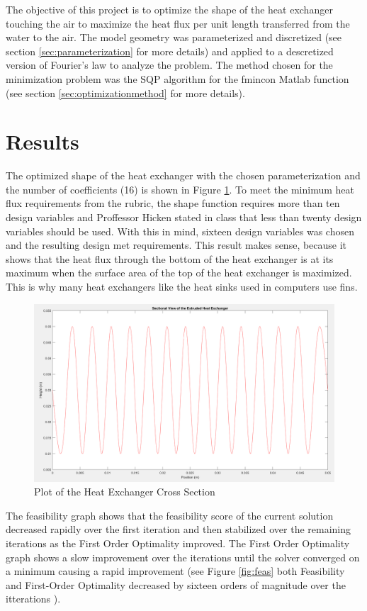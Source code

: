 \documentclass[11pt]{article}%
\begin{document}
The objective of this project is to optimize the shape of the heat exchanger touching the air to maximize the heat flux per unit length transferred from the water to the air. The model geometry was parameterized and discretized (see section \ref{sec:parameterization} for more details) and applied to a descretized version of Fourier’s law to analyze the problem. The method chosen for the minimization problem was the SQP algorithm for the fmincon Matlab function (see section  \ref{sec:optimizationmethod} for more details). 

\section{Results}
The optimized shape of the heat exchanger with the chosen parameterization and the number of coefficients (16) is shown in Figure \ref{fig:cross}. To meet the minimum heat flux requirements from the rubric, the shape function requires more than ten design variables and Proffessor Hicken stated in class that less than twenty design variables should be used. With this in mind, sixteen design variables was chosen and the resulting design met requirements. This result makes sense, because it shows that the heat flux through the bottom of the heat exchanger is at its maximum when the surface area of the top of the heat exchanger is maximized. This is why many heat exchangers like the heat sinks used in computers use fins. 

\begin{figure}[h!]
    \centering
    \includegraphics[width=0.75\linewidth]{crosssection.png}
    \caption{ Plot of the Heat Exchanger Cross Section }
    \label{fig:cross}
\end{figure}

The feasibility graph shows that the feasibility score of the current solution decreased rapidly over the first iteration and then stabilized over the remaining iterations as the First Order Optimality improved. The First Order Optimality graph shows a slow improvement over the iterations until the solver converged on a minimum causing a rapid improvement (see Figure \ref{fig:feas} both Feasibility and First-Order Optimality decreased by sixteen orders of magnitude over the itterations ).
\end{document}
